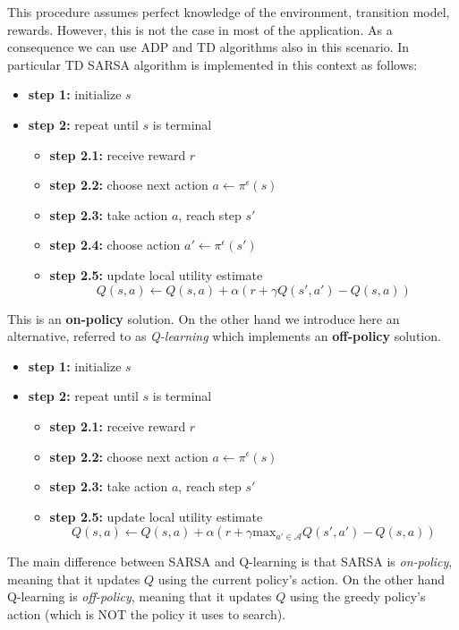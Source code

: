This procedure assumes perfect knowledge of the environment, transition model, rewards. However, this is not the case in most of the application. As a consequence we can use ADP and TD algorithms also in this scenario. In particular TD SARSA algorithm is implemented in this context as follows:

\begin{itemize}
    \item \textbf{step 1:} initialize $s$
    \item \textbf{step 2:} repeat until $s$ is terminal
    \begin{itemize}
        \item \textbf{step 2.1:} receive reward $r$
        \item \textbf{step 2.2:} choose next action $a \leftarrow \pi^\epsilon(s)$
        \item \textbf{step 2.3:} take action $a$, reach step $s'$
        \item \textbf{step 2.4:} choose action $a' \leftarrow \pi^\epsilon(s')$
        \item \textbf{step 2.5:} update local utility estimate
        $$Q(s,a) \leftarrow Q(s,a) + \alpha(r+ \gamma Q(s',a') - Q(s,a))$$
    \end{itemize}
\end{itemize}

This is an \textbf{on-policy} solution. On the other hand we introduce here an alternative, referred to as \textit{Q-learning} which implements an \textbf{off-policy} solution.

\begin{itemize}
    \item \textbf{step 1:} initialize $s$
    \item \textbf{step 2:} repeat until $s$ is terminal
    \begin{itemize}
        \item \textbf{step 2.1:} receive reward $r$
        \item \textbf{step 2.2:} choose next action $a \leftarrow \pi^\epsilon(s)$
        \item \textbf{step 2.3:} take action $a$, reach step $s'$
        \item \textbf{step 2.5:} update local utility estimate
        $$Q(s,a) \leftarrow Q(s,a) + \alpha(r+ \gamma \text{max}_{a' \in \mathcal{A}} Q(s',a') - Q(s,a))$$
    \end{itemize}
\end{itemize}

The main difference between SARSA and Q-learning is that SARSA is \textit{on-policy}, meaning that it updates $Q$ using the current policy's action. On the other hand Q-learning is \textit{off-policy}, meaning that it updates $Q$ using the greedy policy's action (which is NOT the policy it uses to search). \newline

